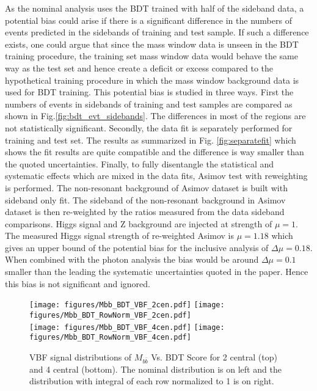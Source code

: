 As the nominal analysis uses the BDT trained with half of the sideband data, a potential bias could arise if there is a significant difference in the numbers of events predicted in the sidebands of training and test sample. If such a difference exists, one could argue that since the mass window data is unseen in the BDT training procedure, the training set mass window data would behave the same way as the test set and hence create a deficit or excess compared to the hypothetical training procedure in which the mass window background data is used for BDT training. This potential bias is studied in three ways. First the numbers of events in sidebands of training and test samples are compared as shown in Fig.\ref{fig:bdt_evt_sidebands}. The differences in most of the regions are not statistically significant. Secondly, the data fit is separately performed for training and test set. The results as summarized in Fig. \ref{fig:separatefit} which shows the fit results are quite compatible and the difference is way smaller than the quoted uncertainties. Finally, to fully disentangle the statistical and systematic effects which are mixed in the data fits, Asimov test with reweighting is performed. The non-resonant background of Asimov dataset is built with sideband only fit. The sideband of the non-resonant background in Asimov dataset is then re-weighted by the ratios measured from the data sideband comparisons. Higgs signal and Z background are injected at strength of $\mu=1$. The measured Higgs signal strength of re-weighted Asimov is $\mu=1.18$ which gives an upper bound of the potential bias for the inclusive analysis of $\Delta \mu = 0.18$. When combined with the photon analysis the bias would be around $\Delta \mu = 0.1$ smaller than the leading the systematic uncertainties quoted in the paper. Hence this bias is not significant and ignored. 


\begin{figure}[htbp]
  \centering
 \texttt{[image: figures/Mbb\_BDT\_VBF\_2cen.pdf]}
 \texttt{[image: figures/Mbb\_BDT\_RowNorm\_VBF\_2cen.pdf]}\\
 \texttt{[image: figures/Mbb\_BDT\_VBF\_4cen.pdf]}
 \texttt{[image: figures/Mbb\_BDT\_RowNorm\_VBF\_4cen.pdf]}\\

\caption{VBF signal distributions of $M_{b\bar b}$ Vs. BDT Score for 2 central (top) and 4 central (bottom). The nominal distribution is on left and the distribution with integral of each row normalized to 1 is on right.}
  \label{fig:Mbb_BDT_VBF}
\end{figure}


